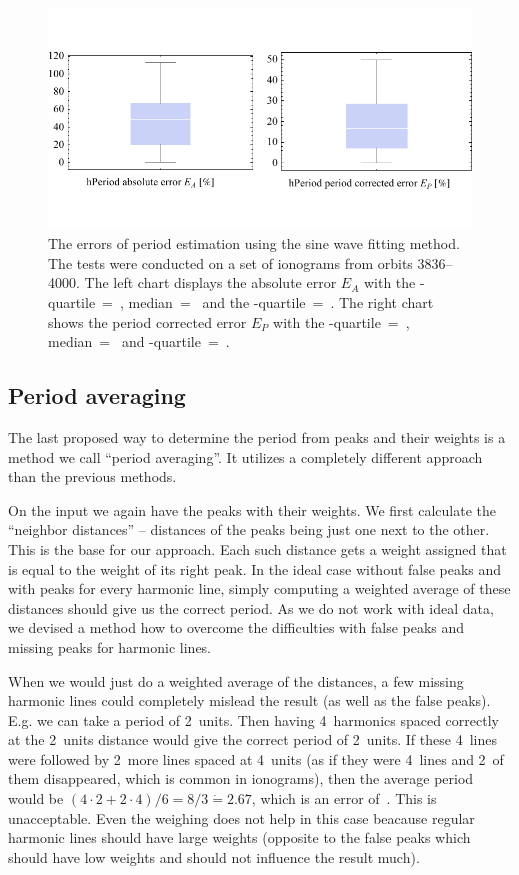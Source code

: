 \begin{figure}
	\centering
	\includegraphics[width=140mm]{images/fitting_errors.pdf}
	\caption{The errors of period estimation using the sine wave fitting method. The tests were conducted on a set of ionograms from orbits 3836--4000. The left chart displays the absolute error $E_A$ with the \mbox{-quartile}~=~, median~=~ and the \mbox{-quartile}~=~. The right chart shows the period corrected error $E_P$ with the \mbox{-quartile}~=~, median~=~ and \mbox{-quartile}~=~.}
	\label{fig:fitting_errors}
\end{figure}

\subsection{Period averaging}
The last proposed way to determine the period from peaks and their weights is a method we call ``period averaging''. It utilizes a completely different approach than the previous methods.

On the input we again have the peaks with their weights. We first calculate the ``neighbor distances'' -- distances of the peaks being just one next to the other. This is the base for our approach. Each such distance gets a weight assigned that is equal to the weight of its right peak. In the ideal case without false peaks and with peaks for every harmonic line, simply computing a weighted average of these distances should give us the correct period. As we do not work with ideal data, we devised a method how to overcome the difficulties with false peaks and missing peaks for harmonic lines.

When we would just do a weighted average of the distances, a few missing harmonic lines could completely mislead the result (as well as the false peaks). E.g. we can take a period of 2~units. Then having 4~harmonics spaced correctly at the 2~units distance would give the correct period of 2~units. If these 4~lines were followed by 2~more lines spaced at 4~units (as if they were 4~lines and 2~of them disappeared, which is common in ionograms), then the average period would be $(4\cdot 2 + 2 \cdot 4)/6 = 8/3 \dot{=} 2.67$, which is an error of~. This is unacceptable. Even the weighing does not help in this case beacause regular harmonic lines should have large weights (opposite to the false peaks which should have low weights and should not influence the result much).

